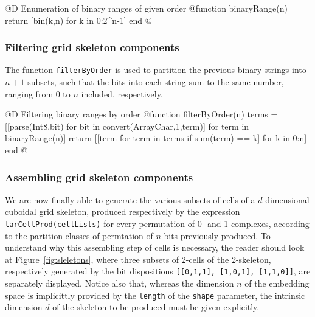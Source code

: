 @D Enumeration of binary ranges of given order
@{function binaryRange(n)
	return [bin(k,n) for k in 0:2^n-1]
end
@}



\subsubsection{Filtering grid skeleton components}
\label{sec:filterByOrder}

The function \texttt{filterByOrder} is used to partition the previous binary strings into $n+1$ subsets, such that the bits into each string sum to the same number, ranging from 0 to $n$ included, respectively.

@D Filtering binary ranges by order
@{function filterByOrder(n)
	terms = [[parse(Int8,bit) for bit in convert(Array{Char,1},term)] for term in binaryRange(n)]
	return [[term for term in terms if sum(term) == k] for k in 0:n]
end
@}




\subsubsection{Assembling grid skeleton components}
\label{sec:assembly}

We are now finally able to generate the various subsets of cells of a $d$-dimensional cuboidal grid skeleton, produced respectively by the expression \texttt{larCellProd(cellLists)} for every permutation of 0- and 1-complexes, according to the partition classes of permtation of $n$ bits previously produced. To understand why this assembling step of cells is necessary, the reader should look at Figure~\ref{fig:sleletons}, where three subsets of 2-cells of the 2-skeleton, respectively generated by the bit dispositions \texttt{[[0,1,1], [1,0,1], [1,1,0]]}, are separately displayed.
Notice also that, whereas the dimension $n$ of the embedding space is implicittly provided by the \texttt{length} of the \texttt{shape} parameter, the intrinsic dimension $d$ of the skeleton to be produced must be given explicitly.

